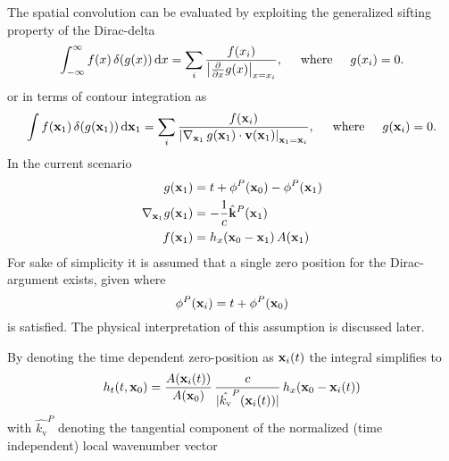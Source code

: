 \documentclass[12pt,a4paper]{article}
\begin{document}
\vspace{1cm}
The spatial convolution can be evaluated by exploiting the generalized sifting property of the Dirac-delta
\begin{equation}
    \int_{-\infty}^{\infty} f(x) \, \delta(g(x)) \, \mathrm{d} x = \sum_{i} \frac{f(x_i)}{\left| \frac{\partial}{\partial x} g(x) \right|_{x = x_i}}, \hspace{5mm} \text{where} \hspace{5mm} g(x_i) = 0.
\end{equation}
or in terms of contour integration as
\begin{equation}
    \int f(\mathbf{x}_1) \, \delta(g(\mathbf{x}_1)) \, \mathrm{d} \mathbf{x}_1 = \sum_{i} \frac{f(\mathbf{x}_i)}{\left| \nabla_{\mathbf{x}_1} \, g(\mathbf{x}_1) \cdot \mathbf{v}(\mathbf{x}_1) \right|_{\mathbf{x}_1 = \mathbf{x}_i}}, \hspace{5mm} \text{where} \hspace{5mm} g(\mathbf{x}_i) = 0.
\end{equation}
In the current scenario 
\begin{align}
    g(\mathbf{x}_1) &= t + \phi^P(\mathbf{x}_0)- \phi^P(\mathbf{x}_1) \\
    \nabla_{\mathbf{x}_1} g(\mathbf{x}_1) &= - \frac{1}{c}  \hat{\mathbf{k}}^P(\mathbf{x}_1) \\
    f(\mathbf{x}_1)  &= h_x(\mathbf{x}_0 - \mathbf{x}_1) \,  A(\mathbf{x}_1)
\end{align}
For sake of simplicity it is assumed that a single zero position for the Dirac-argument exists, given where
\begin{equation}
     \phi^P(\mathbf{x}_i) = t + \phi^P(\mathbf{x}_0)
\end{equation}
is satisfied. 
The physical interpretation of this assumption is discussed later. 

By denoting the time dependent zero-position as $\mathbf{x}_i(t)$ the integral simplifies to 
\begin{equation}
    h_t(t, \mathbf{x}_0)  = \frac{A(\mathbf{x}_i(t)) }{ A(\mathbf{x}_0) }  \,
    \frac{c}{| \hat{k_\mathrm{v}}^P(\mathbf{x}_i(t))  |} \,
     h_x(\mathbf{x}_0 - \mathbf{x}_i(t))
\end{equation}
with $\hat{k_\mathrm{v}}^P$ denoting the tangential component of the normalized (time independent) local wavenumber vector
\end{document}
